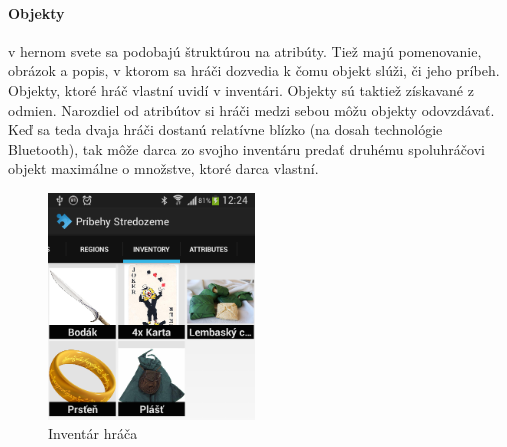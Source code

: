 \paragraph{Objekty} v hernom svete sa podobajú štruktúrou na atribúty. Tiež majú pomenovanie, obrázok a popis, v ktorom sa hráči dozvedia k čomu objekt slúži, či jeho príbeh. Objekty, ktoré hráč vlastní uvidí v inventári. Objekty sú taktiež získavané z odmien. Narozdiel od atribútov si hráči medzi sebou môžu objekty odovzdávať. Keď sa teda dvaja hráči dostanú relatívne blízko (na dosah technológie Bluetooth), tak môže darca zo svojho inventáru predať druhému spoluhráčovi objekt maximálne o množstve, ktoré darca vlastní.
\begin{figure}[ht!]
  \centering
  \includegraphics[height=6cm]{mainmatter/imgs/klient_inventory.png}
  \caption{Inventár hráča}
  \label{fig:klient_inventory}
\end{figure}



